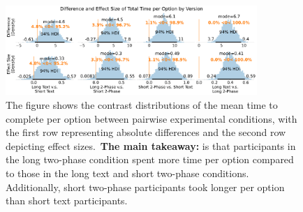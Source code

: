 \begin{figure}[ht!]
    \centering
    \includegraphics[width=0.85\textwidth]{content/image/time/time_diff_per_option_effect_size_by_version}
    \caption{The figure shows the contrast distributions of the mean time to complete per option between pairwise experimental conditions, with the first row representing absolute differences and the second row depicting effect sizes.~\textbf{The main takeaway:} is that participants in the long two-phase condition spent more time per option compared to those in the long text and short two-phase conditions. Additionally, short two-phase participants took longer per option than short text participants.}
    \label{fig:time_per_option_bayesian}
\end{figure}


